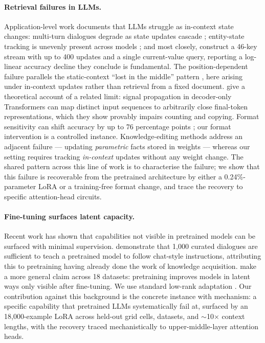 \documentclass[11pt]{article}
\begin{document}
\paragraph{Retrieval failures in LLMs.}
Application-level work documents that LLMs struggle as in-context
state changes: multi-turn dialogues degrade as state updates cascade
\citep{laban2025multiturn}; entity-state tracking is unevenly present
across models \citep{kim2023entity, kim2024code, rezaee2025state};
and most closely, \citet{unable2forget2025} construct a 46-key stream
with up to 400 updates and a single current-value query, reporting
a log-linear accuracy decline they conclude is fundamental. The
position-dependent failure parallels the static-context ``lost in
the middle'' pattern \citep{lostinthemiddle}, here arising under
in-context updates rather than retrieval from a fixed document.
\citet{barbero2024glasses} give a theoretical account of a related
limit: signal propagation in decoder-only Transformers can map
distinct input sequences to arbitrarily close final-token
representations, which they show provably impairs counting and
copying.
Format sensitivity can shift accuracy by up to 76 percentage points
\citep{sclar2024}; our format intervention is a controlled instance.
Knowledge-editing methods \citep{meng2022rome, meng2023memit} address
an adjacent failure --- updating \emph{parametric} facts stored in
weights --- whereas our setting requires tracking \emph{in-context}
updates without any weight change.
The shared pattern across this line of work is to characterise the
failure; we show that this failure is recoverable from the
pretrained architecture by either a 0.24\%-parameter LoRA or a
training-free format change, and trace the recovery to specific
attention-head circuits.

\paragraph{Fine-tuning surfaces latent capacity.}
Recent work has shown that capabilities not visible in pretrained
models can be surfaced with minimal supervision.
\citet{zhou2023lima} demonstrate that 1{,}000 curated dialogues are
sufficient to teach a pretrained model to follow chat-style
instructions, attributing this to pretraining having already done
the work of knowledge acquisition.
\citet{amuro2024finetuning} make a more general claim across 18
datasets: pretraining improves models in latent ways only visible
after fine-tuning.
We use standard low-rank adaptation \citep{hu2021lora,
aghajanyan2021intrinsic}.
Our contribution against this background is the concrete instance
with mechanism: a specific capability that pretrained LLMs
systematically fail at, surfaced by an 18{,}000-example LoRA across
held-out grid cells, datasets, and $\sim$10$\times$ context lengths,
with the recovery traced mechanistically to upper-middle-layer
attention heads.
\end{document}
